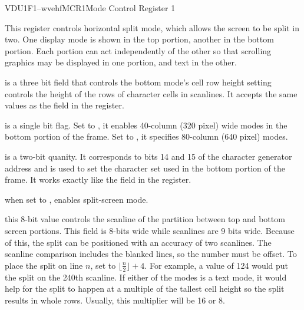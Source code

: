 \begin{ioport}{VDU}{1F1}{--wvehf}{MCR1}{Mode Control Register 1}

  This register controls horizontal split mode, which allows the screen to be
  split in two. One display mode is shown in the top portion, another in the
  bottom portion. Each portion can act independently of the other so that
  scrolling graphics may be displayed in one portion, and text in the other.

  \begin{bitfield}
  \end{bitfield}

  \begin{description}
     is a three bit field that controls the bottom mode's
    cell row height setting controls the height of the rows of character cells
    in scanlines. It accepts the same values as the  field in the
     register.
    
     is a single bit flag. Set to , it enables
    40-column (320 pixel) wide modes in the bottom portion of the frame. Set
    to , it specifies 80-column (640 pixel) modes.

     is a two-bit quanity. It corresponds to bits 14 and 15
    of the character generator address and is used to set the character set
    used in the bottom portion of the frame. It works exactly like the
     field in the  register.

     when set to , enables split-screen mode.

     this 8-bit value controls the scanline of the partition
    between top and bottom screen portions. This field is 8-bits wide while
    scanlines are 9 bits wide. Because of this, the split can be positioned
    with an accuracy of two scanlines. The scanline comparison includes the
    blanked lines, so the number must be offset. To place the split on line
    $n$, set  to $\lfloor\frac{n}{2}\rfloor+4$. For example, a value
    of 124 would put the split on the 240th scanline. If either of the modes is
    a text mode, it would help for the split to happen at a multiple of the
    tallest cell height so the split results in whole rows. Usually, this
    multiplier will be 16 or 8.
  \end{description}
\end{ioport}


